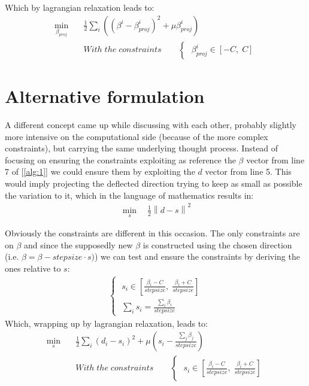 \documentclass[12pt]{article}
\newcommand{\norm}[1]{\left\lVert#1\right\rVert}
\begin{document}
	Which by lagrangian relaxation leads to:
	\begin{equation}\label{eq:10}
	    \begin{aligned}
	    \min_{\beta_{proj}} \quad &\frac{1}{2}\sum_i((\beta^i - \beta_{proj}^i)^2 + \mu \beta_{proj}^i)\\
		&With\;the\;constraints\qquad
        \begin{cases}
            \;\beta_{proj}^i\in[-C,\;C] 
        \end{cases}
        \end{aligned}
	\end{equation}
    
    
    \section{Alternative formulation}
    A different concept came up while discussing with each other, probably slightly more intensive on the computational side (because of the more complex constraints), but carrying the same underlying thought process. Instead of focusing on ensuring the constraints exploiting as reference the $\beta$ vector from line 7 of [\ref{alg:1}] we could ensure them by exploiting the $d$ vector from line 5. This would imply projecting the deflected direction trying to keep as small as possible the variation to it, which in the language of mathematics results in:
    \begin{equation}\label{eq:11}
	    \begin{aligned}
	    \min_{s} \quad \frac{1}{2}\norm{d - s}^2
        \end{aligned}
	\end{equation}
	
	Obviously the constraints are different in this occasion. The only constraints are on $\beta$ and since the supposedly new $\beta$ is constructed using the chosen direction (i.e. $\beta = \beta - stepsize \cdot s)$) we can test and ensure the constraints by deriving the ones relative to $s$:
	\begin{equation}
	    \begin{aligned}
        \begin{cases}
            \;s_i\in[\frac{\beta_i-C}{stepsize},\;\frac{\beta_i+C}{stepsize}]\\
            \;\sum_i s_i = \frac{\sum_i\beta_i}{stepsize}
        \end{cases}
        \end{aligned}
	\end{equation}
	Which, wrapping up by lagrangian relaxation, leads to:
	\begin{equation}
	    \begin{aligned}
	    \min_{s} \quad &\frac{1}{2}\sum_i(d_i - s_i)^2 + \mu(s_i - \frac{\sum_j\beta_j}{stepsize})\\
	    &With\;the\;constraints\qquad
	    \begin{cases}
            \;s_i\in[\frac{\beta_i-C}{stepsize},\;\frac{\beta_i+C}{stepsize}]
        \end{cases}
        \end{aligned}
	\end{equation}
	
\end{document}
